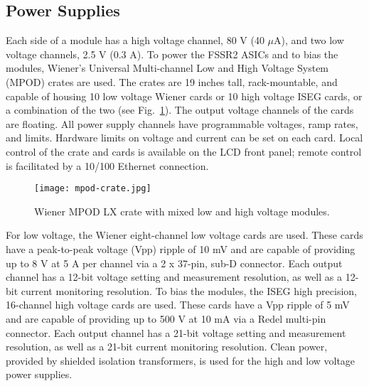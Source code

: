 \subsection{Power Supplies}

Each side of a module has a high voltage channel, 80 V (40 $\mu$A), and two low voltage channels, 2.5 V (0.3 A). To power the FSSR2 ASICs and to bias the modules, Wiener's Universal Multi-channel Low and High Voltage System (MPOD) crates are used. The crates are 19 inches tall, rack-mountable, and capable of housing 10 low voltage Wiener cards or 10 high voltage ISEG cards, or a combination of the two (see Fig.~\ref{fig:mpod-crate}). The output voltage channels of the cards are floating. All power supply channels have programmable voltages, ramp rates, and limits. Hardware limits on voltage and current can be set on each card. Local control of the crate and cards is available on the LCD front panel; remote control is facilitated by a 10/100 Ethernet connection. 

\begin{figure}[hbt] 
\centering 
\texttt{[image: mpod-crate.jpg]}
\caption{Wiener MPOD LX crate with mixed low and high voltage modules.}
\label{fig:mpod-crate}
\end{figure}

For low voltage, the Wiener eight-channel low voltage cards are used. These cards have a peak-to-peak voltage (Vpp) ripple of 10 mV and are capable of providing up to 8 V at 5 A per channel via a 2 x 37-pin, sub-D connector. Each output channel has a 12-bit voltage setting and measurement resolution, as well as a 12-bit current monitoring resolution. To bias the modules, the ISEG high precision, 16-channel high voltage cards are used. These cards have a Vpp ripple of 5 mV and are capable of providing up to 500 V at 10 mA via a Redel multi-pin connector. Each output channel has a 21-bit voltage setting and measurement resolution, as well as a 21-bit current monitoring resolution. Clean power, provided by shielded isolation transformers, is used for the high and low voltage power supplies.

